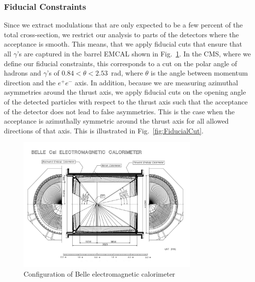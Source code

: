 \subsubsection{Fiducial Constraints}
\label{sec:fiducialcut}
Since we extract modulations that are only expected to be a few percent of the total cross-section, we restrict our analysis to parts of the detectors where the acceptance is smooth. This means, that we apply fiducial cuts that ensure that all $\gamma$'s are captured in the barrel EMCAL shown in Fig.~\ref{fig:2}. In the CMS, where we define our fiducial constraints, this corresponds to a cut on the polar angle of  hadrons and $\gamma$'s of $0.84<\theta<2.53$~rad, where $\theta$ is the angle between momentum direction and the $e^+e^-$ axis.
  In addition, because we are measuring azimuthal asymmetries around the thrust axis, we apply fiducial cuts on the opening angle of the detected particles with respect to the thrust axis such that the acceptance of the detector does not lead to false asymmetries. This is the case when the acceptance is azimuthally symmetric around the thrust axis for all allowed directions of that axis. This is illustrated in Fig.~\ref{fig:FiducialCut}. 

\begin{figure}[H]
  \centering
  \includegraphics[width=0.8\textwidth,natwidth=610,natheight=642]{figure_dataselection/EMCAL.pdf}
  \caption{Configuration of Belle electromagnetic calorimeter~\cite{BelleDetector}}
  \label{fig:2}
\end{figure}


